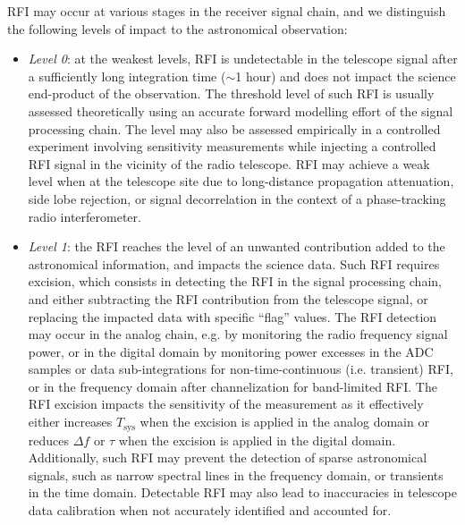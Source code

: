 RFI may occur at various stages in the receiver signal chain, and we distinguish the following levels of impact to the astronomical observation:
\begin{itemize}

\item \emph{Level 0}: at the weakest levels, RFI is undetectable in the telescope signal after a sufficiently long integration time ($\sim$1 hour) and does not impact the science end-product of the observation. The threshold level of such RFI is usually assessed theoretically using an accurate forward modelling effort of the signal processing chain. The level may also be assessed empirically in a controlled experiment involving sensitivity measurements while injecting a controlled RFI signal in the vicinity of the radio telescope. RFI may achieve a weak level when at the telescope site due to long-distance propagation attenuation, side lobe rejection, or signal decorrelation in the context of a phase-tracking radio interferometer.

\item \emph{Level 1}: the RFI reaches the level of an unwanted contribution added to the astronomical information, and impacts the science data. Such RFI requires excision, which consists in detecting the RFI in the signal processing chain, and either subtracting the RFI contribution from the telescope signal, or replacing the impacted data with specific ``flag'' values. The RFI detection may occur in the analog chain, e.g. by monitoring the radio frequency signal power, or in the digital domain by monitoring power excesses in the ADC samples or data sub-integrations for non-time-continuous (i.e. transient) RFI, or in the frequency domain after channelization for band-limited RFI. The RFI excision impacts the sensitivity of the measurement as it effectively either increases $T_{\text{sys}}$ when the excision is applied in the analog domain or reduces $\Delta f$ or $\tau$ when the excision is applied in the digital domain. Additionally, such RFI may prevent the detection of sparse astronomical signals, such as narrow spectral lines in the frequency domain, or transients in the time domain. Detectable RFI may also lead to inaccuracies in telescope data calibration when not accurately identified and accounted for.


\end{itemize}
